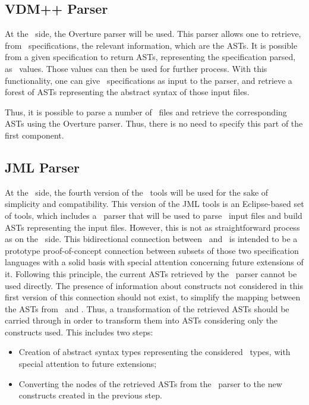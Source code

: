 \subsection{VDM++ Parser}

At the \vpp\ side, the Overture parser will be used. This parser allows one to retrieve, from \vpp\ specifications, the relevant information, which are the ASTs. It is possible from a given specification to return ASTs, representing the specification parsed, as \vpp\ values. Those values can then be used for further process.
With this functionality, one can give \vpp\ specifications as input to the parser, and retrieve a forest of ASTs representing the abstract syntax of those input files.

Thus, it is possible to parse a number of \vpp\ files and retrieve the corresponding ASTs using the Overture parser. Thus, there is no need to specify this part of the first component.

\subsection{JML Parser}

At the \jml\ side, the fourth version of the \jml\ tools \cite{Chalinetal07} will be used for the sake of simplicity and compatibility. This version of the JML tools is an Eclipse-based set of tools, which includes a \jml\ parser that will be used to parse \jml\ input files and build ASTs representing the input files. However, this is not as straightforward process as on the \vpp\ side. This bidirectional connection between \vpp\ and \jml\ is intended to be a prototype proof-of-concept connection between subsets of those two specification languages with a solid basis with special attention concerning future extensions of it. Following this principle, the current ASTs retrieved by the \jml\ parser cannot be used directly. The presence of information about constructs not considered in this first version of this connection should not exist, to simplify the mapping between the ASTs from \jml\ and \vpp. Thus, a transformation of the retrieved ASTs should be carried through in order to transform them into ASTs considering only the constructs used. This includes two steps:
\begin{itemize}
\item Creation of abstract syntax types representing the considered \jml\ types, with special attention to future extensions;
\item Converting the nodes of the retrieved ASTs from the \jml\ parser to the new constructs created in the previous step.
\end{itemize}

